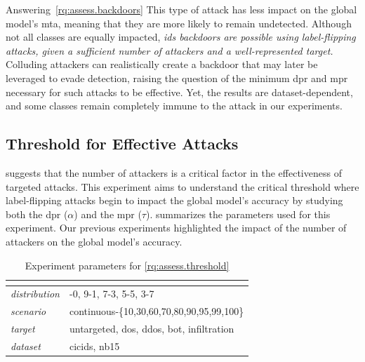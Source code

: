 \begin{answerbox}{Answering~\ref{rq:assess.backdoors} \normalfont\itshape\rqbackdoor}
  This type of attack has less impact on the global model's \gls{mta}, meaning that they are more likely to remain undetected.
  Although not all classes are equally impacted, \emph{\gls{ids} backdoors are possible using label-flipping attacks, given a sufficient number of attackers and a well-represented target.}
  Colluding attackers can realistically create a backdoor that may later be leveraged to evade detection, raising the question of the minimum \gls{dpr} and \gls{mpr} necessary for such attacks to be effective.
  Yet, the results are dataset-dependent, and some classes remain completely immune to the attack in our experiments.
\end{answerbox}



\subsection{Threshold for Effective Attacks\label{sec:results.impact}}

 suggests that the number of attackers is a critical factor in the effectiveness of targeted attacks.
This experiment aims to understand the critical threshold where label-flipping attacks begin to impact the global model's accuracy by studying both the \gls{dpr} ($\alpha$) and the \gls{mpr} ($\tau$).
 summarizes the parameters used for this experiment.
Our previous experiments highlighted the impact of the number of attackers on the global model's accuracy.


\begin{table}
  \caption{
    Experiment parameters for \ref{rq:assess.threshold}
    \label{tbl:assess.threshold}
  }
  \small
  \begin{tabular}{>{\ttfamily\itshape}p{} >{\ttfamily}p{}}
    \toprule
    \multicolumn{2}{>{\bfseries}p{.9\columnwidth}}{\rqthreshold} \\
    \midrule
    distribution & 10-0, 9-1, 7-3, 5-5, 3-7 \\
    scenario & continuous-\{10,30,60,70,80,90,95,99,100\} \\
    target & untargeted, dos, ddos, bot, infiltration \\
    dataset & cicids, nb15 \\
    \bottomrule
  \end{tabular}
\end{table}


